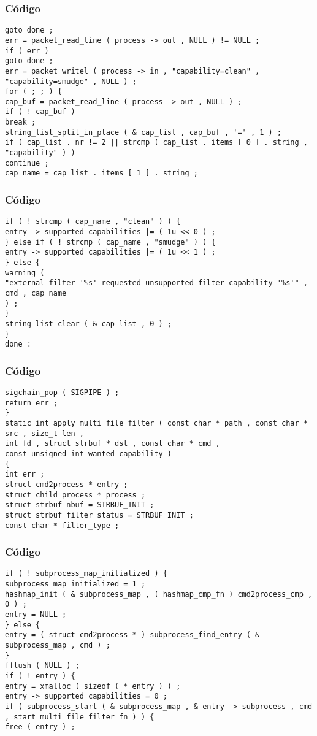 \documentclass{beamer}
\begin{document}
\begin{frame}[fragile]
\frametitle{C\'odigo}
\begin{verbatim}
goto done ; 
err = packet_read_line ( process -> out , NULL ) != NULL ; 
if ( err ) 
goto done ; 
err = packet_writel ( process -> in , "capability=clean" , "capability=smudge" , NULL ) ; 
for ( ; ; ) { 
cap_buf = packet_read_line ( process -> out , NULL ) ; 
if ( ! cap_buf ) 
break ; 
string_list_split_in_place ( & cap_list , cap_buf , '=' , 1 ) ; 
if ( cap_list . nr != 2 || strcmp ( cap_list . items [ 0 ] . string , "capability" ) ) 
continue ; 
cap_name = cap_list . items [ 1 ] . string ; 
\end{verbatim}
\end{frame}
\begin{frame}[fragile]
\frametitle{C\'odigo}
\begin{verbatim}
if ( ! strcmp ( cap_name , "clean" ) ) { 
entry -> supported_capabilities |= ( 1u << 0 ) ; 
} else if ( ! strcmp ( cap_name , "smudge" ) ) { 
entry -> supported_capabilities |= ( 1u << 1 ) ; 
} else { 
warning ( 
"external filter '%s' requested unsupported filter capability '%s'" , 
cmd , cap_name 
) ; 
} 
string_list_clear ( & cap_list , 0 ) ; 
} 
done : 
\end{verbatim}
\end{frame}
\begin{frame}[fragile]
\frametitle{C\'odigo}
\begin{verbatim}
sigchain_pop ( SIGPIPE ) ; 
return err ; 
} 
static int apply_multi_file_filter ( const char * path , const char * src , size_t len , 
int fd , struct strbuf * dst , const char * cmd , 
const unsigned int wanted_capability ) 
{ 
int err ; 
struct cmd2process * entry ; 
struct child_process * process ; 
struct strbuf nbuf = STRBUF_INIT ; 
struct strbuf filter_status = STRBUF_INIT ; 
const char * filter_type ; 
\end{verbatim}
\end{frame}
\begin{frame}[fragile]
\frametitle{C\'odigo}
\begin{verbatim}
if ( ! subprocess_map_initialized ) { 
subprocess_map_initialized = 1 ; 
hashmap_init ( & subprocess_map , ( hashmap_cmp_fn ) cmd2process_cmp , 0 ) ; 
entry = NULL ; 
} else { 
entry = ( struct cmd2process * ) subprocess_find_entry ( & subprocess_map , cmd ) ; 
} 
fflush ( NULL ) ; 
if ( ! entry ) { 
entry = xmalloc ( sizeof ( * entry ) ) ; 
entry -> supported_capabilities = 0 ; 
if ( subprocess_start ( & subprocess_map , & entry -> subprocess , cmd , start_multi_file_filter_fn ) ) { 
free ( entry ) ; 
\end{verbatim}
\end{frame}
\end{document}
